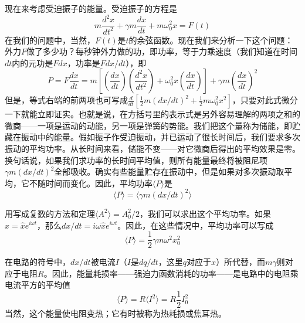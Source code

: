 现在来考虑受迫振子的能量。受迫振子的方程是
\begin{equation}
    \label{Eq:I:24:1}
    m\frac{d^2x}{dt^2} + \gamma m\frac{dx}{dt} + m\omega_0^2x = F(t)
\end{equation}
在我们的问题中，当然，$F(t)$是$t$的余弦函数。现在我们来分析一下这个问题：外力$F$做了多少功？每秒钟外力做的功，即功率，等于力乘速度（我们知道在时间$dt$内的元功是$Fdx$，功率是$Fdx/dt$），即
\begin{equation}
    \label{Eq:I:24:2}
    P=F\frac{dx}{dt} = m \left [ \left (\frac{dx}{dt} \right ) \left ( \frac{d^2x}{dt^2} \right ) + \omega_0^2x\left ( \frac{dx}{dt} \right ) \right ] + \gamma m \left ( \frac{dx}{dt} \right )^2
\end{equation}
但是，等式右端的前两项也可写成$\frac{d}{dt} \left [\frac{1}{2}m(dx/dt)^2 + \frac{1}{2}m\omega_0^2x^2 \right ]$，只要对此式微分一下就能立即证实。也就是说，在方括号里的表示式是另外容易理解的两项之和的微商——一项是运动的动能，另一项是弹簧的势能。我们把这个量称为储能，即贮藏在振动中的能量。假如振子作受迫振动，并已运动了很长时间后，我们要求多次振动的平均功率。从长时间来看，储能不变——对它微商后得出的平均效果是零。换句话说，如果我们求功率的长时间平均值，则所有能量最终将被阻尼项$\gamma m(dx/dt)^2$全部吸收。确实有些能量贮存在振动中，但是如果对多次振动取平均，它不随时间而变化。因此，平均功率$\langle P \rangle $是
\begin{equation}
    \label{Eq:I:24:3}
    \langle P \rangle = \langle \gamma m(dx/dt)^2 \rangle
\end{equation}

用写成复数的方法和定理$\langle A^2 \rangle = A_0^2/2$，我们可以求出这个平均功率。如果$x=\hat{x}e^{i\omega t}$，那么$dx/dt=i\omega\hat{x}e^{i\omega t}$。因此，在这些情况中，平均功率可以写成
\begin{equation}
    \label{Eq:I:24:4}
    \langle P \rangle = \frac{1}{2}\gamma m \omega^2x_0^2
\end{equation}

在电路的符号中，$dx/dt$被电流$I$（$I$是$dq/dt$，这里$q$对应于$x$）所代替，而$m\gamma$则对应于电阻$R$。因此，能量耗损率——强迫力函数消耗的功率——是电路中的电阻乘电流平方的平均值
\begin{equation}
    \label{Eq:I:24:5}
    \langle P \rangle = R \langle I^2 \rangle = R\frac{1}{2}I_0^2
\end{equation}
当然，这个能量使电阻变热；它有时被称为热耗损或焦耳热。

